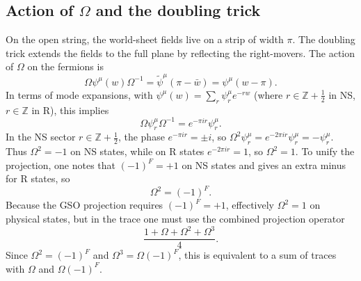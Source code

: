 \documentclass[11pt,a4paper]{article}
\begin{document}
\subsection{Action of $\Omega$ and the doubling trick}
On the open string, the world-sheet fields live on a strip of width $\pi$. The doubling trick extends the fields to the full plane by reflecting the right-movers. The action of $\Omega$ on the fermions is
\begin{equation}
\Omega \psi^\mu(w) \Omega^{-1} = \tilde\psi^\mu(\pi - \bar w) = \psi^\mu(w - \pi).
\end{equation}
In terms of mode expansions, with $\psi^\mu(w) = \sum_r \psi^\mu_r e^{-r w}$ (where $r \in \mathbb{Z}+\frac12$ in NS, $r \in \mathbb{Z}$ in R), this implies
\begin{equation}
\Omega \psi^\mu_r \Omega^{-1} = e^{-\pi i r} \psi^\mu_r.
\end{equation}
In the NS sector $r \in \mathbb{Z}+\frac12$, the phase $e^{-\pi i r} = \pm i$, so $\Omega^2 \psi^\mu_r = e^{-2\pi i r} \psi^\mu_r = -\psi^\mu_r$. Thus $\Omega^2 = -1$ on NS states, while on R states $e^{-2\pi i r} = 1$, so $\Omega^2 = 1$. To unify the projection, one notes that $(-1)^F = +1$ on NS states and gives an extra minus for R states, so
\begin{equation}
\Omega^2 = (-1)^F.
\end{equation}
Because the GSO projection requires $(-1)^F = +1$, effectively $\Omega^2 = 1$ on physical states, but in the trace one must use the combined projection operator
\begin{equation}
\frac{1 + \Omega + \Omega^2 + \Omega^3}{4}.
\end{equation}
Since $\Omega^2 = (-1)^F$ and $\Omega^3 = \Omega (-1)^F$, this is equivalent to a sum of traces with $\Omega$ and $\Omega (-1)^F$.
\end{document}
